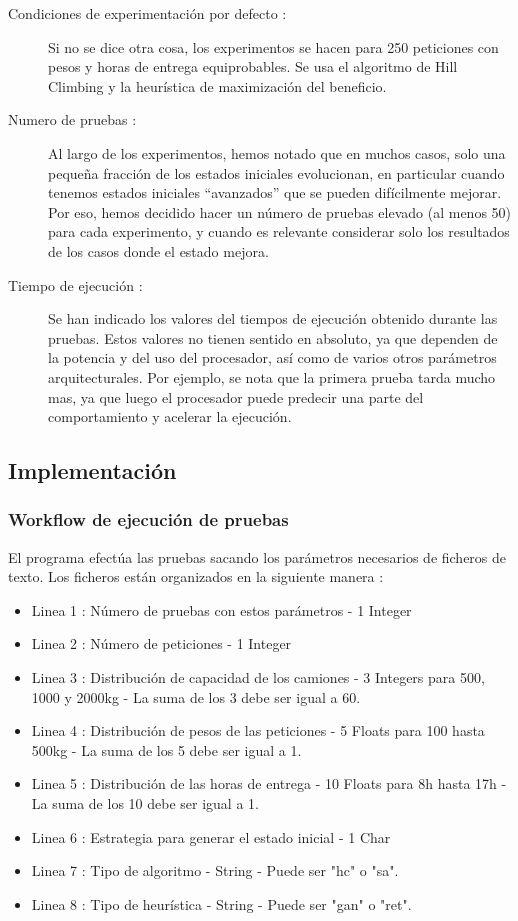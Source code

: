 \documentclass{article}
\begin{document}
\begin{description}
\item[Condiciones de experimentación por defecto :] Si no se dice otra cosa, los
experimentos se hacen para 250 peticiones con pesos y horas de entrega
equiprobables. Se usa el algoritmo de Hill Climbing y la heurística de
maximización del beneficio.
\item[Numero de pruebas :] Al largo de los experimentos, hemos notado que en
muchos casos, solo una pequeña fracción de los estados iniciales evolucionan, en
particular cuando tenemos estados iniciales ``avanzados'' que se pueden
difícilmente mejorar. Por eso, hemos decidido hacer un número de pruebas elevado
(al menos 50) para cada experimento, y cuando es relevante considerar solo los
resultados de los casos donde el estado mejora.
\item[Tiempo de ejecución :] Se han indicado los valores del tiempos de
ejecución obtenido durante las pruebas. Estos valores no tienen sentido en
absoluto, ya que dependen de la potencia y del uso del procesador, así como de
varios otros parámetros arquitecturales. Por ejemplo, se nota que la primera
prueba tarda mucho mas, ya que luego el procesador puede predecir una parte
del comportamiento y acelerar la ejecución.
\end{description}

\subsection{Implementación}

\subsubsection{Workflow de ejecución de pruebas}

El programa efectúa las pruebas sacando los parámetros necesarios de ficheros de
texto. Los ficheros están organizados en la siguiente manera :

\begin{itemize}
\item Linea 1 : Número de pruebas con estos parámetros - 1 Integer
\item Linea 2 : Número de peticiones - 1 Integer
\item Linea 3 : Distribución de capacidad de los camiones - 3 Integers para 500,
1000 y 2000kg - La suma de los 3 debe ser igual a 60.
\item Linea 4 : Distribución de pesos de las peticiones - 5 Floats para 100
hasta 500kg - La suma de los 5 debe ser igual a 1.
\item Linea 5 : Distribución de las horas de entrega - 10 Floats para 8h hasta
17h - La suma de los 10 debe ser igual a 1.
\item Linea 6 : Estrategia para generar el estado inicial - 1 Char
\item Linea 7 : Tipo de algoritmo - String - Puede ser "hc" o "sa".
\item Linea 8 : Tipo de heurística - String - Puede ser "gan" o "ret".
\end{itemize}
\end{document}
